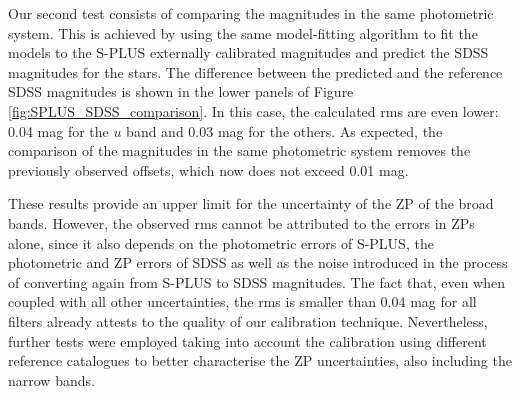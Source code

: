 \documentclass[fleqn,usenatbib]{mnras}
\begin{document}
Our second test consists of comparing the magnitudes in the same photometric system. This is achieved by using the same model-fitting algorithm to fit the models to the S-PLUS externally calibrated magnitudes and predict the SDSS magnitudes for the stars. The difference between the predicted and the reference SDSS magnitudes is shown in the lower panels of Figure \ref{fig:SPLUS_SDSS_comparison}. In this case, the calculated rms are even lower: 0.04 mag for the $u$ band and 0.03 mag for the others. As expected, the comparison of the magnitudes in the same photometric system removes the previously observed offsets, which now does not exceed 0.01 mag.

These results provide an upper limit for the uncertainty of the ZP of the broad bands. However, the observed rms cannot be attributed to the errors in ZPs alone, since it also depends on the photometric errors of S-PLUS, the photometric and ZP errors of SDSS as well as the noise introduced in the process of converting again from S-PLUS to SDSS magnitudes. The fact that, even when coupled with all other uncertainties, the rms is smaller than 0.04 mag for all filters already attests to the quality of our calibration technique. Nevertheless, further tests were employed taking into account the calibration using different reference catalogues to better characterise the ZP uncertainties, also including the narrow bands.
\end{document}
